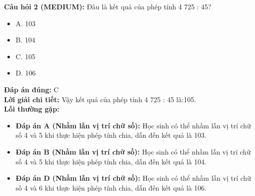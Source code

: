 \documentclass{article}
\begin{document}
\begin{minipage}{\textwidth}
\noindent\textbf{Câu hỏi 2 (MEDIUM):} Đâu là kết quả của phép tính 4 725 : 45? 
\begin{itemize}[label={}]
    \item A. 103
    \item B. 104
    \item C. 105
    \item D. 106
\end{itemize}
\textbf{Đáp án đúng:} C \\
\textbf{Lời giải chi tiết:} Vậy kết quả của phép tính 4 725 : 45 là:105. \\
\textbf{Lỗi thường gặp:}
\begin{itemize}
  \item \textbf{Đáp án A (Nhầm lẫn vị trí chữ số):} Học sinh có thể nhầm lẫn vị trí chữ số 4 và 5 khi thực hiện phép tính chia, dẫn đến kết quả là 103.
  \item \textbf{Đáp án B (Nhầm lẫn vị trí chữ số):} Học sinh có thể nhầm lẫn vị trí chữ số 4 và 5 khi thực hiện phép tính chia, dẫn đến kết quả là 104.
  \item \textbf{Đáp án D (Nhầm lẫn vị trí chữ số):} Học sinh có thể nhầm lẫn vị trí chữ số 4 và 6 khi thực hiện phép tính chia, dẫn đến kết quả là 106.
\end{itemize}
\end{minipage}
\vspace{1em}
\end{document}
